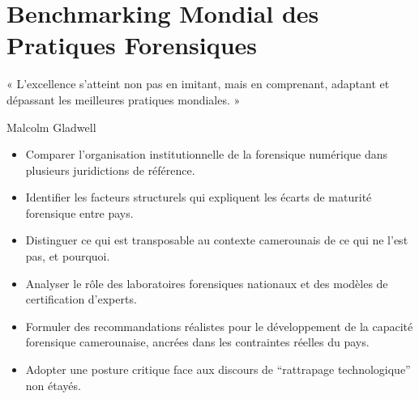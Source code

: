 
\chapter{Benchmarking Mondial des Pratiques Forensiques}
\label{chap:bench}

\epigraph{%
    « L'excellence s'atteint non pas en imitant, mais en comprenant,
    adaptant et dépassant les meilleures pratiques mondiales. »%
}{Malcolm Gladwell}


\begin{boxobjectifs}
\begin{itemize}
    \item Comparer l'organisation institutionnelle de la forensique
          numérique dans plusieurs juridictions de référence.
    \item Identifier les facteurs structurels qui expliquent les
          écarts de maturité forensique entre pays.
    \item Distinguer ce qui est transposable au contexte camerounais
          de ce qui ne l'est pas, et pourquoi.
    \item Analyser le rôle des laboratoires forensiques nationaux
          et des modèles de certification d'experts.
    \item Formuler des recommandations réalistes pour le développement
          de la capacité forensique camerounaise, ancrées dans
          les contraintes réelles du pays.
    \item Adopter une posture critique face aux discours de
          ``rattrapage technologique'' non étayés.
\end{itemize}
\end{boxobjectifs}

\bigskip

